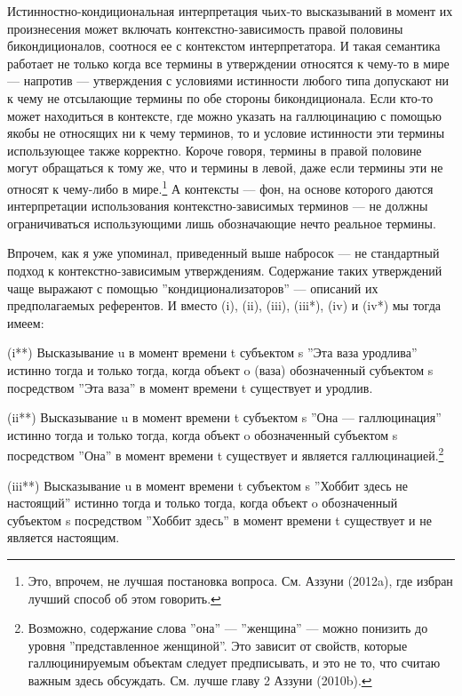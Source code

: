 \documentclass[11pt]{book}
\begin{document}
Истинностно-кондициональная интерпретация чьих-то высказываний в момент их произнесения может включать контекстно-зависимость правой половины бикондиционалов, соотнося ее с контекстом интерпретатора. И такая семантика работает не только когда все термины в утверждении относятся к чему-то в мире --- напротив --- утверждения с условиями истинности любого типа допускают ни к чему не отсылающие термины по обе стороны бикондиционала. Если кто-то может находиться в контексте, где можно указать на галлюцинацию с помощью якобы не относящих ни к чему терминов, то и условие истинности эти термины использующее также корректно. Короче говоря, термины в правой половине могут обращаться к тому же, что и термины в левой, даже если термины эти не относят к чему-либо в мире.\footnote{Это, впрочем, не лучшая постановка вопроса. См. Аззуни (2012a), где избран лучший способ об этом говорить.} А контексты --- фон, на основе которого даются интерпретации использования контекстно-зависимых терминов --- не должны ограничиваться использующими лишь обозначающие нечто реальное термины.

Впрочем, как я уже упоминал, приведенный выше набросок --- не стандартный подход к контекстно-зависимым утверждениям. Содержание таких утверждений чаще выражают с помощью ''кондиционализаторов'' --- описаний их предполагаемых референтов. И вместо (i), (ii), (iii), (iii*), (iv) и (iv*) мы тогда имеем:

\smallskip

(i**) Высказывание u в момент времени t субъектом s ''Эта ваза уродлива'' истинно тогда и только тогда, когда объект o (ваза) обозначенный субъектом s посредством ''Эта ваза'' в момент времени t существует и уродлив.

(ii**) Высказывание u в момент времени t субъектом s ''Она --- галлюцинация'' истинно тогда и только тогда, когда объект o обозначенный субъектом s посредством ''Она'' в момент времени t существует и является галлюцинацией.\footnote{Возможно, содержание слова ''она'' --- ''женщина'' --- можно понизить до уровня ''представленное женщиной''. Это зависит от свойств, которые галлюцинируемым объектам следует предписывать, и это не то, что считаю важным здесь обсуждать. См. лучше главу 2 Аззуни (2010b).}

(iii**) Высказывание u в момент времени t субъектом s ''Хоббит здесь не настоящий'' истинно тогда и только тогда, когда объект o обозначенный субъектом s посредством ''Хоббит здесь'' в момент времени t существует и не является настоящим.
\end{document}
